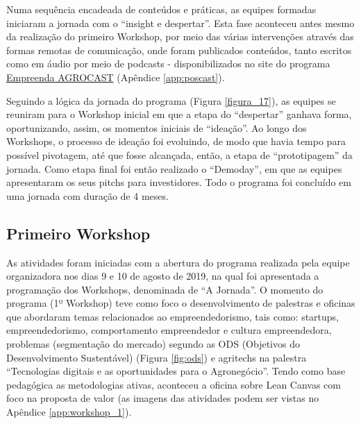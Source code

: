 Numa sequência encadeada de conteúdos e práticas, as equipes formadas iniciaram a jornada com o “insight e despertar”. Esta fase aconteceu antes mesmo da realização do primeiro Workshop, por meio das várias intervenções através das formas remotas de comunicação, onde foram publicados conteúdos, tanto escritos como em áudio por meio de podcasts - disponibilizados no site do programa \href{https://open.spotify.com/show/3c25hRSxvaCFPw6Y3lX3i1?si=9H_fGz_uRgGiFNhAcdr4rQ}{Empreenda AGROCAST} (Apêndice \ref{app:poscast}). 

Seguindo a lógica da jornada do programa (Figura \ref{figura_17}), as equipes se reuniram para o Workshop inicial em que a etapa do “despertar” ganhava forma, oportunizando, assim, os momentos iniciais de “ideação”. Ao longo dos Workshops, o processo de ideação foi evoluindo, de modo que havia tempo para possível pivotagem, até que fosse alcançada, então, a etapa de “prototipagem” da jornada. Como etapa final foi então realizado o “Demoday”, em que as equipes apresentaram os seus pitchs para investidores. Todo o programa foi concluído em uma jornada com duração de 4 meses.

\subsection{Primeiro Workshop}

As atividades foram iniciadas com a abertura do programa realizada pela equipe organizadora nos dias 9 e 10 de agosto de 2019, na qual foi apresentada a programação dos Workshops, denominada de “A Jornada”. O momento do programa (1º Workshop) teve como foco o desenvolvimento de palestras e oficinas que abordaram temas relacionados ao empreendedorismo, tais como: startups, empreendedorismo, comportamento empreendedor e cultura empreendedora, problemas (segmentação do mercado) segundo as ODS (Objetivos do Desenvolvimento Sustentável) (Figura \ref{fig:ods}) e agritechs na palestra “Tecnologias digitais e as oportunidades para o Agronegócio”. Tendo como base pedagógica as metodologias ativas, aconteceu a oficina sobre Lean Canvas com foco na proposta de valor (as imagens das atividades podem ser vistas no Apêndice \ref{app:workshop_1}).

